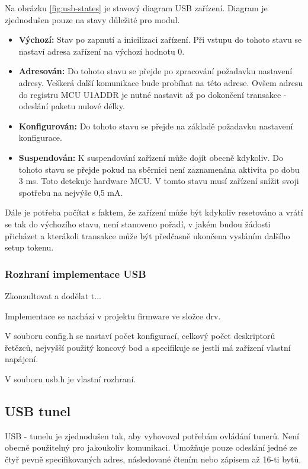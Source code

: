 Na obrázku \ref{fig:usb-states} je stavový diagram USB zařízení. Diagram je zjednodušen pouze na stavy důležité pro modul.
\begin{itemize}
\item \textbf{Výchozí:} Stav po zapnutí a inicilizaci zařízení. Při vstupu do tohoto stavu se nastaví adresa zařízení na výchozí hodnotu 0.
\item \textbf{Adresován:} Do tohoto stavu se přejde po zpracování požadavku nastavení adresy. Veškerá další komunikace bude probíhat na této adrese. Ovšem adresu do registru MCU U1ADDR je nutné nastavit až po dokončení transakce - odeslání paketu nulové délky.
\item \textbf{Konfigurován:} Do tohoto stavu se přejde na základě požadavku nastavení konfigurace. 
\item \textbf{Suspendován:} K suspendování zařízení může dojít obecně kdykoliv. Do tohoto stavu se přejde pokud na sběrnici není zaznamenána aktivita po dobu 3 ms. Toto detekuje hardware MCU. V tomto stavu musí zařízení snížit svoji spotřebu na nejvýše 0,5 mA.
\end{itemize}

Dále je potřeba počítat s faktem, že zařízení může být kdykoliv resetováno a vrátí se tak do výchozího stavu, není stanoveno pořadí, v jakém budou žádosti přicházet a kterákoli transakce může být předčasně ukončena vysláním dalšího setup tokenu. 



\subsubsection{Rozhraní implementace USB}
Zkonzultovat a dodělat t...

Implementace se nachází v projektu firmware ve složce drv.


V souboru config.h se nastaví počet konfigurací, celkový počet deskriptorů řetězců, nejvyšší použitý koncový bod a specifikuje se jestli má zařízení vlastní napájení.

V souboru usb.h je vlastní rozhraní.



\subsection{USB \iic tunel}
\label{subsec:tunel}
USB - \iic tunelu je zjednodušen tak, aby vyhovoval potřebám ovládání tunerů. Není obecně použitelný pro jakoukoliv \iic komunikaci. Umožňuje pouze odeslání jedné ze čtyř pevně specifikovaných adres, následované čtením nebo zápisem až 16-ti bytů.

